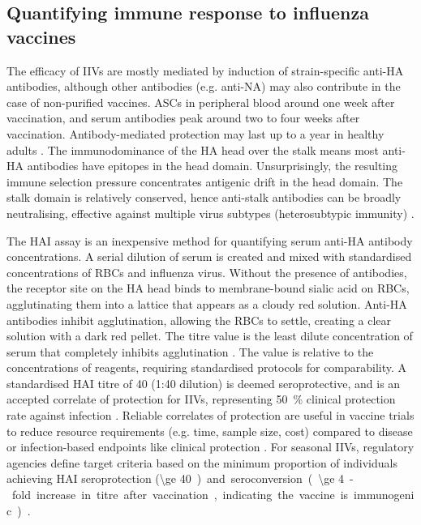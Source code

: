 \subsection{Quantifying immune response to influenza vaccines}

The efficacy of \glspl{IIV} are mostly mediated by induction of strain-specific anti-\gls{HA} antibodies,
although other antibodies (e.g. anti-\gls{NA}) may also contribute in the case of non-purified vaccines.
\Glspl{ASC} in peripheral blood around one week after vaccination, and serum antibodies peak around two to four weeks after vaccination.
Antibody-mediated protection may last up to a year in healthy adults \autocite{bresee2018InactivatedInfluenzaVaccines,davis2020InfluenzaVaccineInduced}.
The immunodominance of the \gls{HA} head over the stalk means most anti-\gls{HA} antibodies have epitopes in the head domain.
Unsurprisingly, the resulting immune selection pressure concentrates antigenic drift in the head domain.
The stalk domain is relatively conserved, hence anti-stalk antibodies can be broadly neutralising, effective against multiple virus subtypes (heterosubtypic immunity) \autocite{sano2017RoadMoreEffective}.

The \gls{HAI} assay is an inexpensive method for quantifying serum anti-\gls{HA} antibody concentrations. 
A serial dilution of serum is created and mixed with standardised concentrations of \glspl{RBC} and influenza virus. 
Without the presence of antibodies, the receptor site on the \gls{HA} head binds to membrane-bound sialic acid on \glspl{RBC}, agglutinating them into a lattice that appears as a cloudy red solution.
Anti-\gls{HA} antibodies inhibit agglutination, allowing the \glspl{RBC} to settle, creating a clear solution with a dark red pellet. 
The titre value is the least dilute concentration of serum that completely inhibits agglutination \autocite{klimov2012InfluenzaVirusTitration}.
The value is relative to the concentrations of reagents, requiring standardised protocols for comparability.
A standardised \gls{HAI} titre of 40 (1:40 dilution) is deemed seroprotective, and is an accepted correlate of protection for \glspl{IIV},
representing \SI{50}{\percent} clinical protection rate against infection \autocite{cox2013CorrelatesProtectionInfluenza,bresee2018InactivatedInfluenzaVaccines}.
Reliable correlates of protection are useful in vaccine trials to reduce resource requirements (e.g. time, sample size, cost) compared to disease or infection-based endpoints like clinical protection \autocite{pulendran2010SystemsVaccinology}.
For seasonal \glspl{IIV}, regulatory agencies define target criteria based on the
minimum proportion of individuals achieving \gls{HAI} seroprotection (\SI{\ge 40}) 
and seroconversion (\SI{\ge 4}-fold increase in titre after vaccination, indicating the vaccine is immunogenic) \autocite{cox2013CorrelatesProtectionInfluenza,sano2017RoadMoreEffective,krammer2019HumanAntibodyResponse}.

